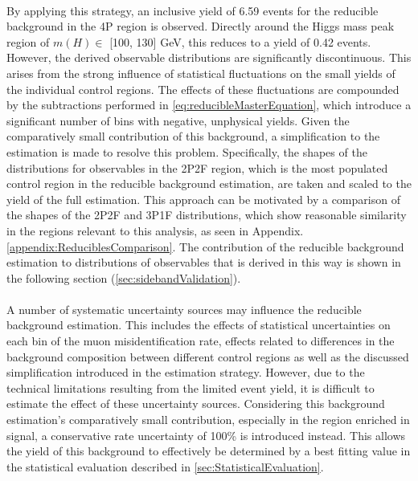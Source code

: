 \\
By applying this strategy, an inclusive yield of 6.59 events for the reducible background in the 4P region is observed. Directly around the Higgs mass peak region of $m(H)\in$ [100, 130] GeV, this reduces to a yield of 0.42 events. However, the derived observable distributions are significantly discontinuous. This arises from the strong influence of statistical fluctuations on the small yields of the individual control regions. The effects of these fluctuations are compounded by the subtractions performed in \autoref{eq:reducibleMasterEquation}, which introduce a significant number of bins with negative, unphysical yields. Given the comparatively small contribution of this background, a simplification to the estimation is made to resolve this problem. Specifically, the shapes of the distributions for observables in the 2P2F region, which is the most populated control region in the reducible background estimation, are taken and scaled to the yield of the full estimation. This approach can be motivated by a comparison of the shapes of the 2P2F and 3P1F distributions, which show reasonable similarity in the regions relevant to this analysis, as seen in Appendix. \autoref{appendix:ReduciblesComparison}. The contribution of the reducible background estimation to distributions of observables that is derived in this way is shown in the following section (\autoref{sec:sidebandValidation}). \\
\\
A number of systematic uncertainty sources may influence the reducible background estimation. This includes the effects of statistical uncertainties on each bin of the muon misidentification rate, effects related to differences in the background composition between different control regions as well as the discussed simplification introduced in the estimation strategy. However, due to the technical limitations resulting from the limited event yield, it is difficult to estimate the effect of these uncertainty sources. Considering this background estimation's comparatively small contribution, especially in the region enriched in signal, a conservative rate uncertainty of 100\% is introduced instead. This allows the yield of this background to effectively be determined by a best fitting value in the statistical evaluation described in \autoref{sec:StatisticalEvaluation}.

